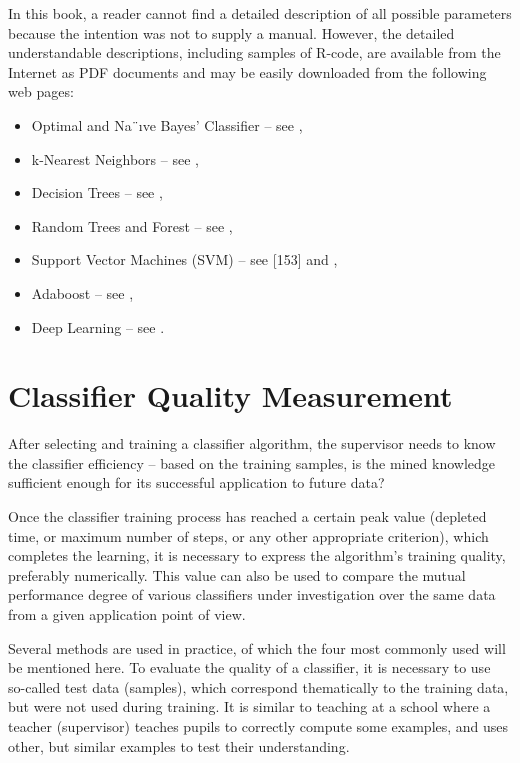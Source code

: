 In this book, a reader cannot find a detailed description of all possible parameters because the intention was not to supply a manual. However, the detailed
understandable descriptions, including samples of R-code, are available from the Internet as PDF documents and may be easily downloaded from the following
web pages:

\begin{itemize}
    \item Optimal and Na¨ıve Bayes’ Classifier – see \cite{ref182},
    \item k-Nearest Neighbors – see \cite{ref226},
    \item Decision Trees – see \cite{ref154},
    \item Random Trees and Forest – see \cite{ref171},
    \item Support Vector Machines (SVM) – see [153] and \cite{ref193},
    \item Adaboost – see \cite{ref60},
    \item Deep Learning – see \cite{ref83}.
\end{itemize}

\section{Classifier Quality Measurement}

After selecting and training a classifier algorithm, the supervisor needs to know
the classifier efficiency – based on the training samples, is the mined knowledge
sufficient enough for its successful application to future data?

Once the classifier training process has reached a certain peak value (depleted
time, or maximum number of steps, or any other appropriate criterion), which
completes the learning, it is necessary to express the algorithm’s training quality, preferably numerically. This value can also be used to compare the mutual
performance degree of various classifiers under investigation over the same data
from a given application point of view.

Several methods are used in practice, of which the four most commonly used
will be mentioned here. To evaluate the quality of a classifier, it is necessary to
use so-called test data (samples), which correspond thematically to the training
data, but were not used during training. It is similar to teaching at a school where
a teacher (supervisor) teaches pupils to correctly compute some examples, and
uses other, but similar examples to test their understanding.

